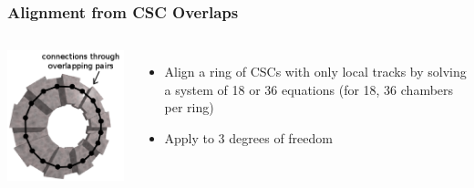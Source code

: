 \documentclass[compress]{beamer}
\begin{document}
\begin{frame}
\frametitle{Alignment from CSC Overlaps}

\begin{columns}
\includegraphics[width=1.25\linewidth]{matrix_description_onestation.png}

\begin{itemize}
\item Align a ring of CSCs with only local tracks by solving a system of 18 or 36 equations (for 18, 36 chambers per ring)
\item Apply to 3 degrees of freedom
\end{itemize}


\end{columns}
\end{frame}
\end{document}
